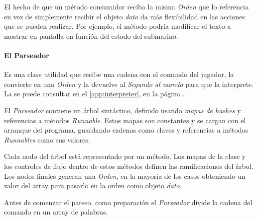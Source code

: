 \documentclass[a4paper,
	11pt,
	parskip=full,
	bibliography=totoc,
	twoside
	]{scrartcl}
\begin{document}
			El hecho de que un método consumidor reciba la misma \textit{Orden} que lo referencia en vez de simplemente recibir el objeto \textit{dato} da más flexibilidad en las acciones que se pueden realizar. Por ejemplo, el método podría modificar el texto a mostrar en pantalla en función del estado del submarino.
			
		\paragraph{El Parseador}
			Es una clase utilidad que recibe una cadena con el comando del jugador, la convierte en una \textit{Orden} y la devuelve al \textit{Segundo al mando} para que la interprete. La  se puede consultar en el \autoref{app:interpreter}, en la página \pageref{app:interpreter}.
			
			El \textit{Parseador} contiene un árbol sintáctico, definido usando \textit{mapas de hashes} y referencias a métodos \textit{Runnable}\footnotemark. Estos mapas son constantes y se cargan con el arranque del programa, guardando cadenas como claves y referencias a métodos \textit{Runnables} como sus valores.
			
			Cada nodo del árbol está representado por un método. Los mapas de la clase y los controles de flujo dentro de estos métodos definen las ramificaciones del árbol. Los nodos finales generan una \textit{Orden}, en la mayoría de los casos obteniendo un valor del array para pasarlo en la orden como objeto \textit{dato}.
			
			Antes de comenzar el parseo, como preparación el \textit{Parseador} divide la cadena del comando en un array de palabras.
			
\end{document}
